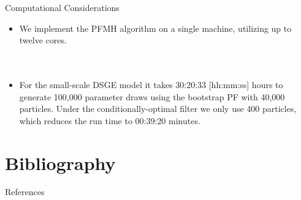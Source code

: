 \documentclass[presentation]{beamer}
\begin{document}
\begin{frame}[label={sec:org0c70297}]{Computational Considerations}
\begin{itemize}
\item We implement the PFMH algorithm on a single machine, utilizing up to
twelve cores.
\\~\\~
\item For the small-scale DSGE model it takes	 30:20:33 [hh:mm:ss]
hours to generate 100,000 parameter draws using the bootstrap PF with
40,000 particles.  Under the conditionally-optimal filter we only use
400 particles, which reduces the run time to 00:39:20 minutes.
\end{itemize}
\end{frame}




\section{Bibliography}
\label{sec:org30490b9}
\begin{frame}[fragile,allowframebreaks,label=]{References}


\end{frame}
\end{document}
